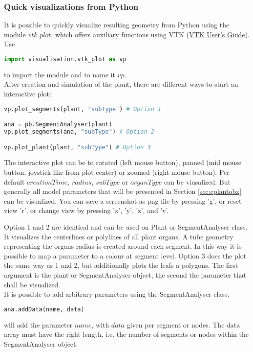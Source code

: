 
\subsubsection*{Quick visualizations from Python}

It is possible to quickly visualize resulting geometry from Python using the module $vtk\_plot$, which offers auxiliary functions using VTK (\href{https://vtk.org/vtk-users-guide/}{VTK User's Guide}). Use 
\begin{lstlisting}[language=Python]
import visualisation.vtk_plot as vp
\end{lstlisting}
to import the module and to name it $vp$. \\

After creation and simulation of the plant, there are different ways to start an interactive plot:
\begin{lstlisting}[language=Python]
vp.plot_segments(plant, "subType") # Option 1

ana = pb.SegmentAnalyser(plant)
vp.plot_segments(ana, "subType") # Option 2

vp.plot_plant(plant, "subType") # Option 3
\end{lstlisting}
The interactive plot can be to rotated (left mouse button), panned (mid mouse button, joystick like from plot center) or zoomed (right mouse button). Per default $creationTime$, $radius$, $subType$ or $organType$ can be viusalized. But generally all model parameters that will be presented in Section \ref{sec:cplantobx} can be visualized. You can save a screenshot as png file by pressing 'g', or reset view 'r', or change view by pressing 'x', 'y', 'z', and 'v'.

Option 1 and 2 are identical and can be used on Plant or SegmentAnalyser class. It visualizes the centerlines or polylines of all plant organs. A tube geometry representing the organs radius is created around each segment. In this way it is possible to map a parameter to a colour at segment level.  Option 3 does the plot the same way as 1 and 2, but additionally plots the leafs a polygons. The first argument is the plant or SegmentAnalyser object, the second the parameter that shall be visualized. \\

It is possible to add arbitrary parameters using the SegmentAnalyser class: 
\begin{lstlisting}[language=Python]
ana.addData(name, data) 
\end{lstlisting}
will add the parameter $name$, with $data$ given per segment or nodes. The data array must have the right length, i.e. the number of segments or nodes within the SegmentAnalyser object. \\

